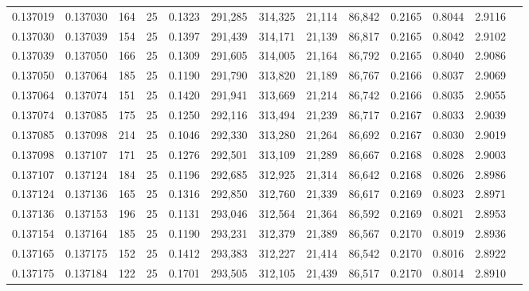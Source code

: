 \begin{tabular}{rrrrrrrrrrrrr}
0.137019 & 0.137030 &   164 &  25 &                                     0.1323 & 291,285 & 314,325 &  21,114 &  86,842 & 0.2165 & 0.8044 & 2.9116 \\
0.137030 & 0.137039 &   154 &  25 &                                     0.1397 & 291,439 & 314,171 &  21,139 &  86,817 & 0.2165 & 0.8042 & 2.9102 \\
0.137039 & 0.137050 &   166 &  25 &                                     0.1309 & 291,605 & 314,005 &  21,164 &  86,792 & 0.2165 & 0.8040 & 2.9086 \\
0.137050 & 0.137064 &   185 &  25 &                                     0.1190 & 291,790 & 313,820 &  21,189 &  86,767 & 0.2166 & 0.8037 & 2.9069 \\
0.137064 & 0.137074 &   151 &  25 &                                     0.1420 & 291,941 & 313,669 &  21,214 &  86,742 & 0.2166 & 0.8035 & 2.9055 \\
0.137074 & 0.137085 &   175 &  25 &                                     0.1250 & 292,116 & 313,494 &  21,239 &  86,717 & 0.2167 & 0.8033 & 2.9039 \\
0.137085 & 0.137098 &   214 &  25 &                                     0.1046 & 292,330 & 313,280 &  21,264 &  86,692 & 0.2167 & 0.8030 & 2.9019 \\
0.137098 & 0.137107 &   171 &  25 &                                     0.1276 & 292,501 & 313,109 &  21,289 &  86,667 & 0.2168 & 0.8028 & 2.9003 \\
0.137107 & 0.137124 &   184 &  25 &                                     0.1196 & 292,685 & 312,925 &  21,314 &  86,642 & 0.2168 & 0.8026 & 2.8986 \\
0.137124 & 0.137136 &   165 &  25 &                                     0.1316 & 292,850 & 312,760 &  21,339 &  86,617 & 0.2169 & 0.8023 & 2.8971 \\
0.137136 & 0.137153 &   196 &  25 &                                     0.1131 & 293,046 & 312,564 &  21,364 &  86,592 & 0.2169 & 0.8021 & 2.8953 \\
0.137154 & 0.137164 &   185 &  25 &                                     0.1190 & 293,231 & 312,379 &  21,389 &  86,567 & 0.2170 & 0.8019 & 2.8936 \\
0.137165 & 0.137175 &   152 &  25 &                                     0.1412 & 293,383 & 312,227 &  21,414 &  86,542 & 0.2170 & 0.8016 & 2.8922 \\
0.137175 & 0.137184 &   122 &  25 &                                     0.1701 & 293,505 & 312,105 &  21,439 &  86,517 & 0.2170 & 0.8014 & 2.8910 \\

\end{tabular}

